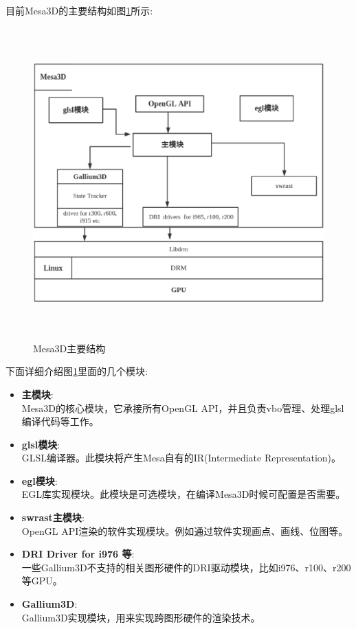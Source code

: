 
目前Mesa3D的主要结构如图\ref{fig:Mesa3D}所示:


\begin{figure}[H] 
  \centering
  \includegraphics[width=16cm,height=12cm]{figures/chap02/Mesa3D}
  \caption{Mesa3D主要结构}
  \label{fig:Mesa3D}
\end{figure}

下面详细介绍图\ref{fig:Mesa3D}里面的几个模块:

\begin{itemize}
\item{\textbf{主模块}}: \\
Mesa3D的核心模块，它承接所有OpenGL API，并且负责vbo管理、处理glsl编译代码等工作。
\item{\textbf{glsl模块}}: \\
GLSL编译器。此模块将产生Mesa自有的IR(Intermediate Representation)。
\item{\textbf{egl模块}}: \\
EGL库实现模块。此模块是可选模块，在编译Mesa3D时候可配置是否需要。
\item{\textbf{swrast主模块}}: \\
OpenGL API渲染的软件实现模块。例如通过软件实现画点、画线、位图等。
\item{\textbf{DRI Driver for i976 等}}: \\
一些Gallium3D不支持的相关图形硬件的DRI驱动模块，比如i976、r100、r200等GPU。
\item{\textbf{Gallium3D}}: \\
Gallium3D实现模块，用来实现跨图形硬件的渲染技术。
\end{itemize}


